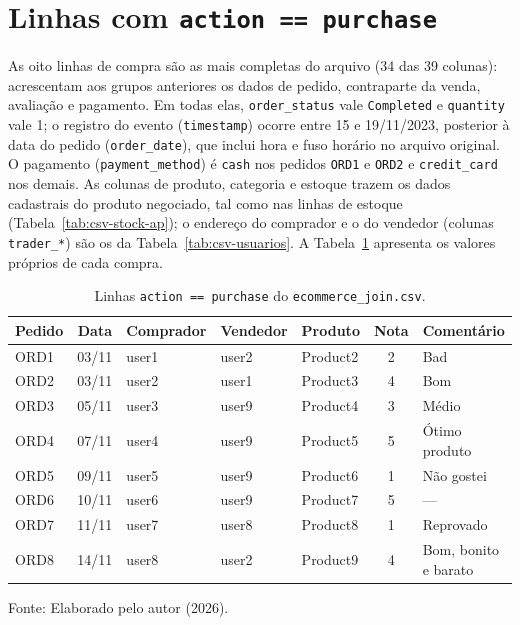\section{Linhas com \texttt{action == purchase}}

As oito linhas de compra são as mais completas do arquivo (34 das 39 colunas):
acrescentam aos grupos anteriores os dados de pedido, contraparte da venda, avaliação e
pagamento. Em todas elas, \texttt{order\_status} vale \texttt{Completed} e
\texttt{quantity} vale 1; o registro do evento (\texttt{timestamp}) ocorre entre 15 e
19/11/2023, posterior à data do pedido (\texttt{order\_date}), que inclui hora e fuso
horário no arquivo original. O pagamento (\texttt{payment\_method}) é \texttt{cash} nos
pedidos \texttt{ORD1} e \texttt{ORD2} e \texttt{credit\_card} nos demais. As colunas de
produto, categoria e estoque trazem os dados
cadastrais do produto negociado, tal como nas linhas de estoque
(Tabela~\ref{tab:csv-stock-ap}); o endereço do comprador e o do vendedor (colunas
\texttt{trader\_*}) são os da Tabela~\ref{tab:csv-usuarios}. A
Tabela~\ref{tab:csv-purchase-ap} apresenta os valores próprios de cada compra.

\begin{table}[H]
  \caption{Linhas \texttt{action == purchase} do \texttt{ecommerce\_join.csv}.}
  \label{tab:csv-purchase-ap}
  \centering
  \setlength{\tabcolsep}{3pt}%
  \begin{tabular}{l c l l l c l}
    \toprule
    \textbf{Pedido} & \textbf{Data} & \textbf{Comprador} & \textbf{Vendedor} & \textbf{Produto} & \textbf{Nota} & \textbf{Comentário} \\
    \midrule
    ORD1 & 03/11 & user1 & user2 & Product2 & 2 & Bad \\
    ORD2 & 03/11 & user2 & user1 & Product3 & 4 & Bom \\
    ORD3 & 05/11 & user3 & user9 & Product4 & 3 & Médio \\
    ORD4 & 07/11 & user4 & user9 & Product5 & 5 & Ótimo produto \\
    ORD5 & 09/11 & user5 & user9 & Product6 & 1 & Não gostei \\
    ORD6 & 10/11 & user6 & user9 & Product7 & 5 & --- \\
    ORD7 & 11/11 & user7 & user8 & Product8 & 1 & Reprovado \\
    ORD8 & 14/11 & user8 & user2 & Product9 & 4 & Bom, bonito e barato \\
    \bottomrule
  \end{tabular}
  \par\vspace{4pt}
  {\footnotesize Fonte: Elaborado pelo autor (2026).}
\end{table}


